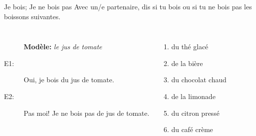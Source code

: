 \documentclass{beamer}
\begin{document}
  \begin{frame}{Je bois; Je ne bois pas}
    Avec un/e partenaire, dis si tu bois ou si tu ne bois pas les boissons suivantes. \\
    \begin{columns}
        \begin{description}
          \item[] \textbf{Modèle:} \emph{le jus de tomate}
          \item[E1:] Oui, je bois du jus de tomate.
          \item[E2:] Pas moi! Je ne bois pas de jus de tomate.
        \end{description}
        \begin{enumerate}
          \item du thé glacé
          \item de la bière
          \item du chocolat chaud
          \item de la limonade
          \item du citron pressé
          \item du café crème
        \end{enumerate}
    \end{columns}
  \end{frame}
\end{document}
